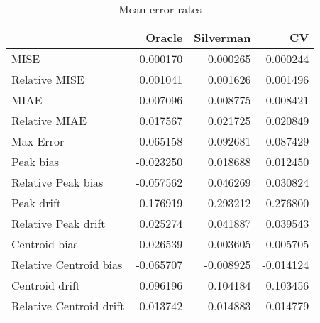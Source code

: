 \begin{table}[H]
\centering
\begin{tabular}{lrrr}
  \hline
 & Oracle & Silverman & CV \\ 
  \hline
MISE & 0.000170 & 0.000265 & 0.000244 \\ 
  Relative MISE & 0.001041 & 0.001626 & 0.001496 \\ 
  MIAE & 0.007096 & 0.008775 & 0.008421 \\ 
  Relative MIAE & 0.017567 & 0.021725 & 0.020849 \\ 
  Max Error & 0.065158 & 0.092681 & 0.087429 \\ 
  Peak bias & -0.023250 & 0.018688 & 0.012450 \\ 
  Relative Peak bias & -0.057562 & 0.046269 & 0.030824 \\ 
  Peak drift & 0.176919 & 0.293212 & 0.276800 \\ 
  Relative Peak drift & 0.025274 & 0.041887 & 0.039543 \\ 
  Centroid bias & -0.026539 & -0.003605 & -0.005705 \\ 
  Relative Centroid bias & -0.065707 & -0.008925 & -0.014124 \\ 
  Centroid drift & 0.096196 & 0.104184 & 0.103456 \\ 
  Relative Centroid drift & 0.013742 & 0.014883 & 0.014779 \\ 
   \hline
\end{tabular}
\caption{Mean error rates} 
\label{tbl:mean_error_rates}
\end{table}
